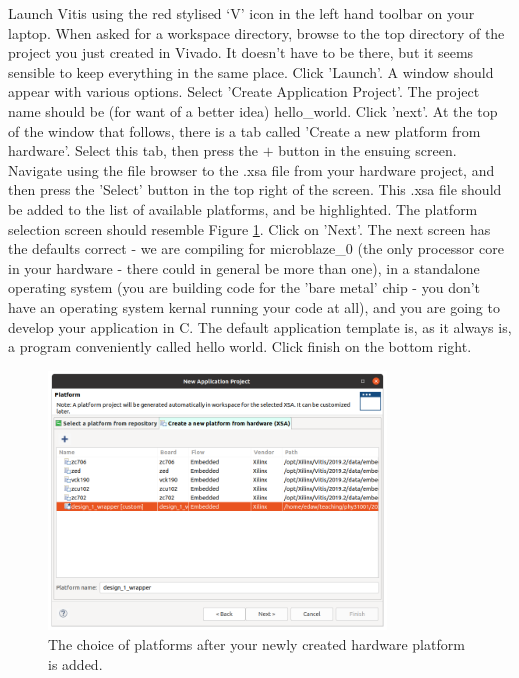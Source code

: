 \documentclass[../physical_computing.tex]{subfiles}
\begin{document}
Launch Vitis using the red stylised `V' icon in the left hand toolbar on your laptop. When asked for a workspace directory, browse to the top directory of the project you just created in Vivado. It doesn't have to be there, but it seems sensible to keep everything in the same place. Click 'Launch'. A window should appear with various options. Select 'Create Application Project'. The project name should be (for want of a better idea) hello\_world. Click 'next'. At the top of the window that follows, there is a tab called 'Create a new platform from hardware'. Select this tab, then press the $+$ button in the ensuing screen. Navigate using the file browser to the .xsa file from your hardware project, and then press the 'Select' button in the top right of the screen. This .xsa file should be added to the list of available platforms, and be highlighted. The platform selection screen should resemble Figure \ref{fig:selectplatform}. Click on 'Next'. The next screen has the defaults correct - we are compiling for microblaze\_0 (the only processor core in your hardware - there could in general be more than one), in a standalone operating system (you are building code for the 'bare metal' chip - you don't have an operating system kernal running your code at all), and you are going to develop your application in C. The default application template is, as it always is, a program conveniently called hello world. Click finish on the bottom right.

\begin{figure}[h!]
    \centering
    \includegraphics[width=0.8\textwidth]{figures/selectplatform.png}
    \caption{The choice of platforms after your newly created hardware platform is added.}
    \label{fig:selectplatform}
\end{figure}
\end{document}
